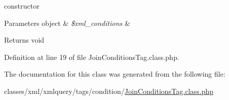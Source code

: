 constructor 
\begin{DoxyParams}[1]{Parameters}
object & {\em \$xml\+\_\+conditions} & \\
\hline
\end{DoxyParams}
\begin{DoxyReturn}{Returns}
void 
\end{DoxyReturn}


Definition at line 19 of file Join\+Conditions\+Tag.\+class.\+php.



The documentation for this class was generated from the following file\+:\begin{DoxyCompactItemize}
\item 
classes/xml/xmlquery/tags/condition/\hyperlink{JoinConditionsTag_8class_8php}{Join\+Conditions\+Tag.\+class.\+php}\end{DoxyCompactItemize}
